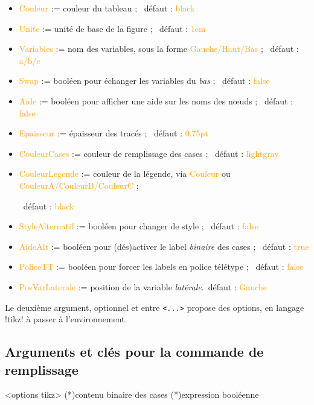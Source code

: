 \documentclass[french,a4paper,11pt]{article}
\newcommand\Cle[1]{{\small\sffamily\textlangle \textcolor{orange}{#1}\textrangle}}
\begin{document}
{{\begin{tipblock}
\begin{itemize}
	\item \Cle{Couleur} := couleur du tableau ; \hfill~défaut : \Cle{black}
	\item \Cle{Unite} := unité de base de la figure ; \hfill~défaut : \Cle{1cm}
	\item \Cle{Variables} := nom des variables, sous la forme \Cle{Gauche/Haut/Bas} ; \hfill~défaut : \Cle{a/b/c}
	\item \Cle{Swap} := booléen pour échanger les variables du \textit{bas} ; \hfill~défaut : \Cle{false}
	\item \Cle{Aide} := booléen pour afficher une aide sur les noms des nœuds ; \hfill~défaut : \Cle{false}
	\item \Cle{Epaisseur} := épaisseur des tracés ; \hfill~défaut : \Cle{0.75pt}
	\item \Cle{CouleurCases} := couleur de remplissage des cases ; \hfill~défaut : \Cle{lightgray}
	\item \Cle{CouleurLegende} := couleur de la légende, via \Cle{Couleur} ou \Cle{CouleurA/CouleurB/CouleurC} ;
	
	\hfill~défaut : \Cle{black}
	\item \Cle{StyleAlternatif} := booléen pour changer de style ; \hfill~défaut : \Cle{false}
	\item \Cle{AideAlt} := booléen pour (dés)activer le label \textit{binaire} des cases ; \hfill~défaut : \Cle{true}
	\item \Cle{PoliceTT} := booléen pour forcer les labels en police télétype ; \hfill~défaut : \Cle{false}
	\item \Cle{PosVarLaterale} := position de la variable \textit{latérale}.\hfill~défaut : \Cle{Gauche}
\end{itemize}

Le deuxième argument, optionnel et entre \texttt{<...>} propose des options, en langage \packagetex!tikz! à passer à l'environnement.
\end{tipblock}

\subsection{Arguments et clés pour la commande de remplissage}

\begin{DemoCode}
\begin{TableKarnaugh}[clés]<options tikz>
	\KarnaughCasesResult(*){contenu binaire des cases}
	\KarnaughCasesAuto(*){expression booléenne}
\end{TableKarnaugh}
\end{DemoCode}

}}
\end{document}

